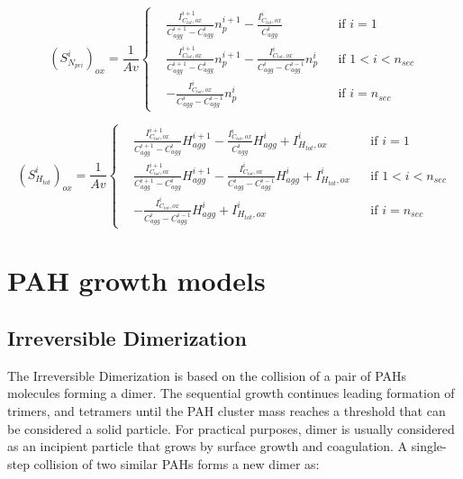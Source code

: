 \begin{equation}
	\left(S^i_{N_{pri}}\right)_{ox}=
	\frac{1}{Av}
	\left\{
	\begin{aligned}
		&\frac{I^{i+1}_{C_{tot},ox}}{C^{i+1}_{agg}-C^{i}_{agg}}n^{i+1}_p
		-
		\frac{I^{i}_{C_{tot},ox}}{C^{i}_{agg}}
		&&
		\text{if } i = 1
		\\
		&\frac{I^{i+1}_{C_{tot},ox}}{C^{i+1}_{agg}-C^{i}_{agg}}n^{i+1}_p
		-
		\frac{I^{i}_{C_{tot},ox}}{C^{i}_{agg}-C^{i-1}_{agg}}n^{i}_p
		&&
		\text{if } 1 < i < n_{sec}
		\\
		&
		-
		\frac{I^{i}_{C_{tot},ox}}{C^{i}_{agg}-C^{i-1}_{agg}}n^{i}_p
		&&\text{if } i=n_{sec}
	\end{aligned}
	\right.
	\label{eqn:S_Npri_oxsect}
\end{equation}

\begin{equation}
	\left(S^i_{H_{tot}}\right)_{ox}=
	\frac{1}{Av}
	\left\{
	\begin{aligned}
		&\frac{I^{i+1}_{C_{tot},ox}}{C^{i+1}_{agg}-C^{i}_{agg}}H^{i+1}_{agg}
		-
		\frac{I^{i}_{C_{tot},ox}}{C^{i}_{agg}}H^{i}_{agg}
		+ I^{i}_{H_{tot}, ox}
		&&
		\text{if } i = 1
		\\
		&\frac{I^{i+1}_{C_{tot},ox}}{C^{i+1}_{agg}-C^{i}_{agg}}H^{i+1}_{agg}
		-
		\frac{I^{i}_{C_{tot},ox}}{C^{i}_{agg}-C^{i-1}_{agg}}H^{i}_{agg}
		+ I^{i}_{H_{tot}, ox}
		&&
		\text{if } 1 < i < n_{sec}
		\\
		&
		-
		\frac{I^{i}_{C_{tot},ox}}{C^{i}_{agg}-C^{i-1}_{agg}}H^{i}_{agg}
		+ I^{i}_{H_{tot}, ox}
		&&\text{if } i=n_{sec}
	\end{aligned}
	\right.
	\label{eqn:S_Htot_oxsect}
\end{equation}



\section{PAH growth models}

\subsection{Irreversible Dimerization}
\label{sec:irrevdim}

The Irreversible Dimerization is based on the collision of a pair of PAHs molecules forming a dimer. The sequential growth continues leading formation of trimers, and tetramers until the PAH cluster mass reaches a threshold that can be considered a solid particle. For practical purposes, dimer is usually considered as an incipient particle that grows by surface growth and coagulation. A single-step collision of two similar PAHs forms a new dimer as:

